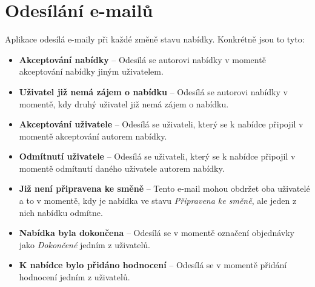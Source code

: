 \section{Odesílání e-mailů}

\label{nur:mail}

Aplikace odesílá e-maily při každé změně stavu nabídky. Konkrétně jsou to tyto:
\begin{itemize}
    \item \textbf{Akceptování nabídky} -- Odesílá se autorovi nabídky v momentě akceptování nabídky jiným uživatelem.
    \item \textbf{Uživatel již nemá zájem o nabídku} -- Odesílá se autorovi nabídky v momentě, kdy druhý uživatel již nemá zájem o nabídku.
    \item \textbf{Akceptování uživatele} -- Odesílá se uživateli, který se k nabídce připojil v momentě akceptování autorem nabídky.
    \item \textbf{Odmítnutí uživatele} -- Odesílá se uživateli, který se k nabídce připojil v momentě odmítnutí daného uživatele autorem nabídky.
    \item \textbf{Již není připravena ke směně} -- Tento e-mail mohou obdržet oba uživatelé a to v momentě, kdy je nabídka ve stavu \textit{Připravena ke směně}, ale jeden z nich nabídku odmítne.
    \item \textbf{Nabídka byla dokončena} -- Odesílá se v momentě označení objednávky jako \textit{Dokončené} jedním z uživatelů.
    \item \textbf{K nabídce bylo přidáno hodnocení} -- Odesílá se v momentě přidání hodnocení jedním z uživatelů.
\end{itemize}